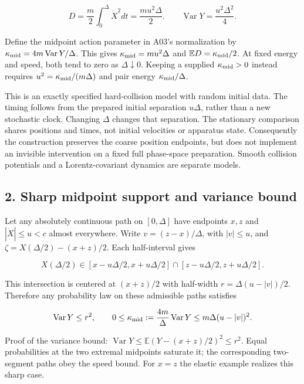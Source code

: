 \documentclass[11pt,a4paper]{article}
\begin{document}
\[D=\frac m2\int_0^\Delta\dot X^2dt=\frac{mu^2\Delta}{2}.
\qquad \operatorname{Var}Y=\frac{u^2\Delta^2}{4}.\]

Define the midpoint action parameter in A03's normalization by
\(\kappa_{\rm mid}=4m\operatorname{Var}Y/\Delta\). This gives
\(\kappa_{\rm mid}=mu^2\Delta\) and \(\mathbb E D=\kappa_{\rm mid}/2\).
At fixed energy and speed, both tend to zero as \(\Delta\downarrow0\).
Keeping a supplied \(\kappa_{\rm mid}>0\) instead requires
\(u^2=\kappa_{\rm mid}/(m\Delta)\) and pair energy
\(\kappa_{\rm mid}/\Delta\).

This is an exactly specified hard-collision model with random initial
data. The timing follows from the prepared initial separation
\(u\Delta\), rather than a new stochastic clock. Changing \(\Delta\)
changes that separation. The stationary comparison shares positions and
times, not initial velocities or apparatus state. Consequently the
construction preserves the coarse position endpoints, but does not
implement an invisible intervention on a fixed full phase-space
preparation. Smooth collision potentials and a Lorentz-covariant
dynamics are separate models.

\hypertarget{sharp-midpoint-support-and-variance-bound}{%
\subsection{2. Sharp midpoint support and variance
bound}\label{sharp-midpoint-support-and-variance-bound}}

Let any absolutely continuous path on \([0,\Delta]\) have endpoints
\(x,z\) and \(|\dot X|\le u<c\) almost everywhere. Write
\(v=(z-x)/\Delta\), with \(|v|\le u\), and
\(\zeta=X(\Delta/2)-(x+z)/2\). Each half-interval gives

\[X(\Delta/2)\in[x-u\Delta/2,x+u\Delta/2]
\cap[z-u\Delta/2,z+u\Delta/2].\]

This intersection is centered at \((x+z)/2\) with half-width
\(r=\Delta(u-|v|)/2\). Therefore any probability law on these admissible
paths satisfies

\[\operatorname{Var}Y\le r^2,
\qquad 0\le\kappa_{\rm mid}:=\frac{4m}{\Delta}\operatorname{Var}Y
\le m\Delta(u-|v|)^2.\]

Proof of the variance bound:
\(\operatorname{Var}Y\le \mathbb E(Y-(x+z)/2)^2\le r^2\). Equal
probabilities at the two extremal midpoints saturate it; the
corresponding two-segment paths obey the speed bound. For \(x=z\) the
elastic example realizes this sharp case.
\end{document}
